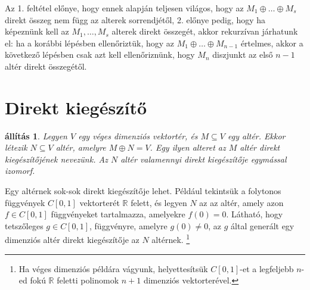 \documentclass[9pt, showtrims]{memoir}
\theoremstyle{plain}
\newtheorem{proposition}{állítás}[section]
\theoremstyle{remark}
\theoremstyle{definition}
\renewcommand{\mathbf}{\mathbb}
\begin{document}
Az 1. feltétel előnye, hogy ennek alapján teljesen világos, hogy az 
$M_1\oplus\dots\oplus M_s$ direkt összeg nem függ az alterek sorrendjétől,
2. előnye pedig,
hogy ha képeznünk kell az $M_1,\dots,M_s$ alterek direkt összegét, 
akkor rekurzívan járhatunk el: 
ha a korábbi lépésben ellenőriztük, hogy az $M_1\oplus\dots\oplus M_{n-1}$ értelmes, akkor 
a következő lépésben csak azt kell ellenőriznünk, 
hogy $M_n$ diszjunkt az első $n-1$ altér direkt összegétől.

\section{Direkt kiegészítő}
\begin{proposition}
    Legyen $V$ egy véges dimenziós vektortér, és $M\subseteq V$ egy altér.
    Ekkor létezik $N\subseteq V$ altér,
    amelyre $M\oplus N=V$.
    Egy ilyen alteret az $M$ altér \emph{direkt kiegészítőjének} nevezünk.
    Az $N$ altér valamennyi direkt kiegészítője egymással izomorf.
\end{proposition}
Egy altérnek sok-sok direkt kiegészítője lehet.
Például tekintsük a folytonos függvények $C\left[ 0,1 \right]$ vektorterét $\mathbf{R}$ felett,
és legyen $N$ az az altér, amely azon $f\in C\left[ 0,1 \right]$ függvényeket tartalmazza, 
amelyekre $f\left( 0 \right)=0$.
Látható, hogy tetszőleges $g\in C\left[ 0,1 \right]$, függvényre, amelyre $g\left( 0 \right)\neq 0$,
az $g$ által generált egy dimenziós altér direkt kiegészítője az $N$ altérnek.%
\footnote{
    Ha véges dimenziós példára vágyunk, 
    helyettesítsük $C\left[ 0,1 \right]$-et a legfeljebb $n$-ed fokú 
    $\mathbf{R}$ feletti polinomok $n+1$ dimenziós vektorterével.
}
\end{document}
